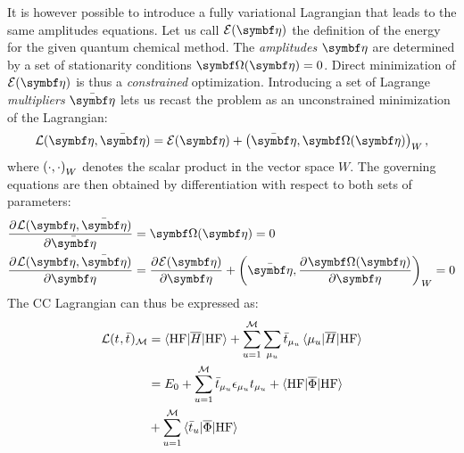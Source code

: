 It is however possible to introduce a fully variational Lagrangian that
leads to the same amplitudes equations.\autocite{Helgaker1982-xl, Arponen1983-qt,
Helgaker1988-to, Helgaker1989-wl, Koch1990-vr, Kvaal2013-jr}
Let us call $\mathcal{E}(\vect{\eta})$ the definition of the energy
for the given quantum chemical method.
The \emph{amplitudes} $\vect{\eta}$ are determined by a set of
stationarity conditions $\mat{\Omega}(\vect{\eta}) = 0$.
Direct minimization of $\mathcal{E}(\vect{\eta})$ is thus a
\emph{constrained} optimization.
Introducing a set of Lagrange \emph{multipliers} $\bar{\vect{\eta}}$
lets us recast the problem as an unconstrained minimization of the
Lagrangian:
\begin{equation}
  \mathcal{L}(\vect{\eta}, \bar{\vect{\eta}}) =
  \mathcal{E}(\vect{\eta}) +
  \scalprod[W]{\bar{\vect{\eta}}}{\mat{\Omega}(\vect{\eta})},
\end{equation}
where $\scalprod[W]{\cdot}{\cdot}$ denotes the scalar product in the
vector space $W$.
The governing equations are then obtained by differentiation with
respect to both sets of parameters:
\begin{subequations}
  \begin{align}
    \pderiv{\mathcal{L}(\vect{\eta}, \bar{\vect{\eta}})}{\bar{\vect{\eta}}}
    &= \mat{\Omega}(\vect{\eta}) = 0 \\
    \pderiv{\mathcal{L}(\vect{\eta}, \bar{\vect{\eta}})}{\vect{\eta}}
    &= \pderiv{\mathcal{E}(\vect{\eta})}{\vect{\eta}} +
    \scalprod[W]{\bar{\vect{\eta}}}{\pderiv{\mat{\Omega(\vect{\eta})}}{\vect{\eta}}}
    = 0
  \end{align}
\end{subequations}
The \acrshort{CC} Lagrangian can thus be expressed as:
\begin{equation}\label{eq:cc-lagrangian}
  \begin{aligned}
    \mathcal{L}(\tamp{}, \tbar{})_\mathcal{M}
    &=
    \braket{\mathrm{HF} | \overline{H} | \mathrm{HF}}
    + \sum_{u=1}^{\mathcal{M}}\sum_{\mu_u}
    \tbar{\mu_u}\braket{\mu_u | \overline{H} | \mathrm{HF}} \\
    &=
  E_0
  + \sum_{u=1}^{\mathcal{M}}\tbar{\mu_u}\denom{\mu_u}\tamp{\mu_u}
  + \braket{\mathrm{HF} | \overline{\Phi} | \mathrm{HF}} \\
  &+ \sum_{u=1}^{\mathcal{M}}\braket{\tbar{u} | \overline{\Phi} | \mathrm{HF}}
  \end{aligned}
\end{equation}
